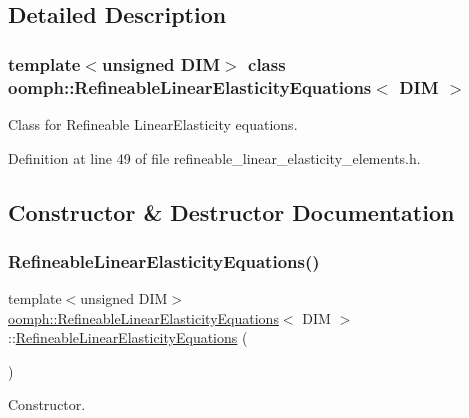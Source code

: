 \subsection{Detailed Description}
\subsubsection*{template$<$unsigned D\+IM$>$\newline
class oomph\+::\+Refineable\+Linear\+Elasticity\+Equations$<$ D\+I\+M $>$}

Class for Refineable Linear\+Elasticity equations. 

Definition at line 49 of file refineable\+\_\+linear\+\_\+elasticity\+\_\+elements.\+h.



\subsection{Constructor \& Destructor Documentation}
\mbox{\label{classoomph_1_1RefineableLinearElasticityEquations_a948ffa175a7a2299beb06150f69cb750}} 
\subsubsection{\texorpdfstring{Refineable\+Linear\+Elasticity\+Equations()}{RefineableLinearElasticityEquations()}}
{\footnotesize\ttfamily template$<$unsigned D\+IM$>$ \\
\hyperlink{classoomph_1_1RefineableLinearElasticityEquations}{oomph\+::\+Refineable\+Linear\+Elasticity\+Equations}$<$ D\+IM $>$\+::\hyperlink{classoomph_1_1RefineableLinearElasticityEquations}{Refineable\+Linear\+Elasticity\+Equations} (\begin{DoxyParamCaption}{ }\end{DoxyParamCaption})\hspace{0.3cm}{\ttfamily [inline]}}



Constructor. 



